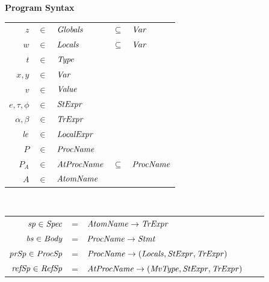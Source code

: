 

\begin{figure}
\setlength{\tabcolsep}{3pt}
{\bf Program Syntax} \\
\begin{tabular}{rclcl}
$z$ & $\in$ & $\mathit{Globals}$ & $\subseteq$ &$\mathit{Var}$ \\
$w$ & $\in$ & $\mathit{Locals}$ & $\subseteq$ & $\mathit{Var}$ \\
$t$ & $\in$ & $\mathit{Type}$ \\
$x,y$ & $\in$ & $\mathit{Var}$ \\
$v$ &  $\in$ & $\mathit{Value}$ \\
$e, \tau, \phi$ & $\in$ & $\mathit{StExpr}$ \\
$\alpha, \beta$ & $\in$ & $\mathit{TrExpr}$ \\
$\mathit{le}$ & $\in$ & $\mathit{LocalExpr}$ \\
$P$ & $\in$ & $\mathit{ProcName}$ \\
$P_{A}$ & $\in$ & $\mathit{AtProcName}$ & $\subseteq$ & $\mathit{ProcName}$ \\
$A$ & $\in$ & $\mathit{AtomName}$ \\
\end{tabular}\\
\begin{tabular}{rclcl}
$\mathit{sp} \in \mathit{Spec}$ & = & $\mathit{AtomName} \rightarrow \mathit{TrExpr}$ \\
$\mathit{bs} \in \mathit{Body}$ & = & $\mathit{ProcName} \rightarrow \mathit{Stmt}$ \\
$\mathit{prSp} \in \mathit{ProcSp}$ & = & $\mathit{ProcName} \rightarrow (\mathit{Locals},\mathit{StExpr},\mathit{TrExpr})$\\
$\mathit{refSp} \in \mathit{RefSp}$ & = & $\mathit{AtProcName} \rightarrow (\mathit{MvType},\mathit{StExpr},\mathit{TrExpr})$

\end{tabular}
\end{figure}
